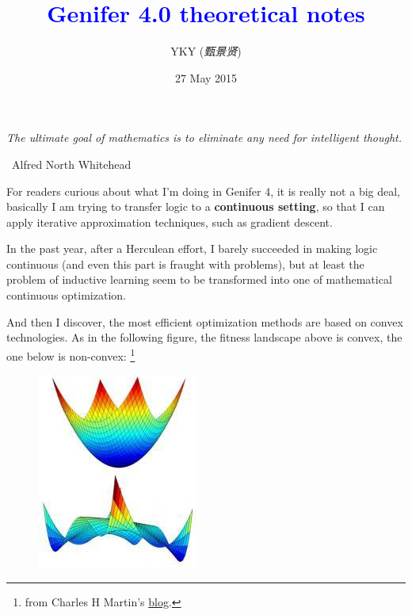\documentclass[12pt]{article}
\title{\textcolor{blue}{Genifer 4.0 theoretical notes}}
\author{YKY (\textit{甄景贤})}
\date{27 May 2015}
\newcommand{\tab}{\hspace*{1cm}}
\begin{document}
\tab\tab\tab \parbox{9cm}{\textit{The ultimate goal of mathematics is to eliminate any need for intelligent thought.}}
\begin{flushright}
\textemdash\, Alfred North Whitehead \hspace{1cm}
\end{flushright}

\sffamily

{\let\newpage\relax\maketitle}

\maketitle
\setlength{\parindent}{0em}
\setlength{\parskip}{1.5ex plus0.5ex minus1.2ex}

For readers curious about what I'm doing in Genifer 4, it is really not a big deal, basically I am trying to transfer logic to a \textbf{continuous setting}, so that I can apply iterative approximation techniques, such as gradient descent.

In the past year, after a Herculean effort, I barely succeeded in making logic continuous (and even this part is fraught with problems), but at least the problem of inductive learning seem to be transformed into one of mathematical continuous optimization.

And then I discover, the most efficient optimization methods are based on convex technologies.  As in the following figure, the fitness landscape above is convex, the one below is non-convex: \footnote{from Charles H Martin's \href{https://charlesmartin14.wordpress.com/2013/11/14/metric-learning-some-quantum-statistical-mechanics/}{blog}.}
\begin{figure}[H]
\centering
\includegraphics[scale=0.6]{convex-and-nonconvex.jpg}
\end{figure}
\end{document}
